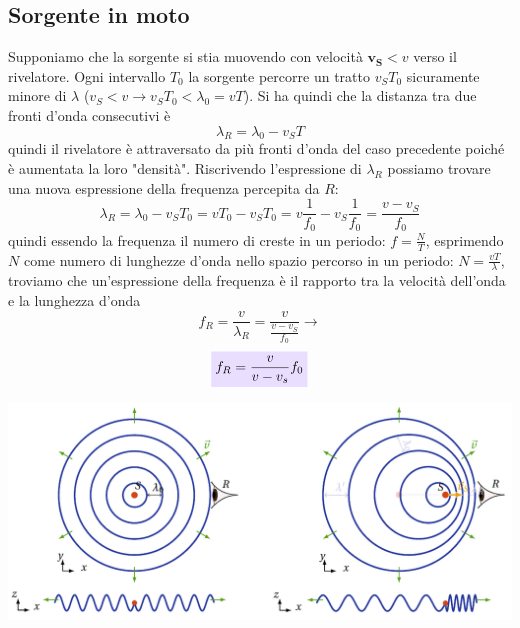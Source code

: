 \documentclass[x11names]{report}
\newcommand{\viola}[1]{\colorbox{yred}{$\displaystyle #1$}}
\begin{document}
	\subsection{Sorgente in moto}
	Supponiamo che la sorgente si stia muovendo con velocità \(\boldsymbol{v_S} < v\) verso il rivelatore. Ogni intervallo \(T_0\) la sorgente percorre un tratto \(v_ST_0\) sicuramente minore di \(\lambda\) (\(v_S < v \to v_ST_0 < \lambda_0= vT\)). Si ha quindi che la distanza tra due fronti d'onda consecutivi è
	\[ 
	\lambda_R = \lambda_0 - v_ST
	\]
	quindi il rivelatore è attraversato da più fronti d'onda del caso precedente poiché è aumentata la loro "densità". Riscrivendo l'espressione di \(\lambda_R\) possiamo trovare una nuova espressione della frequenza percepita da \(R\): 
	\[ 
	\lambda_R = \lambda_0 - v_ST_0 = vT_0 - v_ST_0 = v\frac{1}{f_0} - v_S\frac{1}{f_0} = \frac{v - v_S}{f_0}
	\]
	quindi essendo la frequenza il numero di creste in un periodo: \(f =\frac{N}{T}\), esprimendo \(N\) come numero di lunghezze d'onda nello spazio percorso in un periodo: \(N = \frac{vT}{\lambda}\), troviamo che un'espressione della frequenza è il rapporto tra la velocità dell'onda e la lunghezza d'onda 
	\[ 
	f_R = \frac{v}{\lambda_R} = \frac{v}{\frac{v - v_S}{f_0}} \to
	\]
	\begin{equation}
		\viola{f_R = \frac{v}{v - v_s}f_0}
	\end{equation}
	
	\begin{center}
		\includegraphics[scale=0.4]{imgs/doppler.png}
	\end{center}
	
\end{document}
